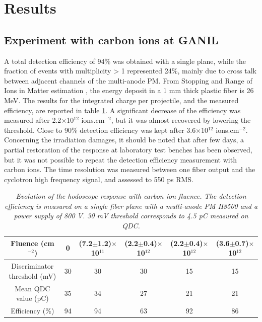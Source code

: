 \documentclass[a4paper,11pt]{article}
\begin{document}
\section{Results}
\subsection{Experiment with carbon ions at GANIL}
A total detection efficiency of 94\% was obtained with a single plane, while the fraction of events with multiplicity > 1 represented 24\%, mainly due to cross talk between adjacent channels of the multi-anode PM.
From Stopping and Range of Ions in Matter estimation \cite{Ziegler2010}, the energy deposit in a 1 mm thick plastic fiber is 26 MeV. The results for the integrated charge per projectile, and the measured efficiency, are reported in table \ref{tab:GANIL}. A significant decrease of the efficiency was measured after 2.2$\times$10$^{12}$ ions.cm$^{-2}$, but it was almost recovered by lowering the threshold. 
Close to 90\% detection efficiency was kept after 3.6$\times$10$^{12}$ ions.cm$^{-2}$.
Concerning the irradiation damages, it should be noted that after few days, a partial restoration of the response at laboratory test benches has been observed, but it was not possible to repeat the detection efficiency measurement with carbon ions. 
The time resolution was measured between one fiber output and the cyclotron high frequency signal, and assessed to 550 ps RMS. 
\begin{table}[H]
\centering
\begin{tabular}{|c|c|c|c|c|c|}
\hline
Fluence (cm$^{-2}$)& 0 & (7.2$\pm$1.2)$\times$10$^{11}$ & (2.2$\pm$0.4)$\times$10$^{12}$ & (2.2$\pm$0.4)$\times$10$^{12}$ & (3.6$\pm$0.7)$\times$10$^{12}$\\
\hline
\makecell{Discriminator\\threshold (mV)} & 30 & 30 & 30 & 15 & 15\\
\hline
\makecell{Mean QDC\\value (pC)} & 35 & 34 & 27 & 21 & 21\\
\hline
Efficiency (\%) & 94 & 94 & 63 & 92 & 86\\
\hline
\end{tabular}
\caption{\small{\textit{Evolution of the hodoscope response with carbon ion fluence. The detection efficiency is measured on a single fiber plane with a multi-anode PM H8500 and a power supply of 800 V. 30 mV threshold corresponds to 4.5 pC measured on QDC.}}}
\label{tab:GANIL}
\end{table}
\end{document}
